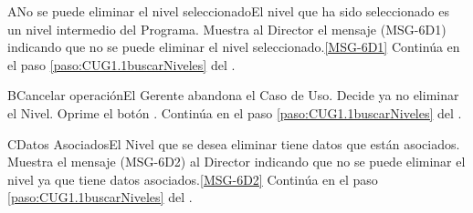 		\begin{UCtrayectoriaA}{A}{No se puede eliminar el nivel seleccionado}{El nivel que ha sido seleccionado es un nivel intermedio del Programa.}
			\UCpaso Muestra al Director el mensaje (MSG-6D1) indicando que no se puede eliminar el nivel seleccionado.\ref{MSG-6D1}
			\UCpaso Continúa en el paso \ref{paso:CUG1.1buscarNiveles} del .
		\end{UCtrayectoriaA}

		\begin{UCtrayectoriaA}{B}{Cancelar operación}{El Gerente abandona el Caso de Uso.}
			\UCpaso[\UCactor] Decide ya no eliminar el Nivel.
			\UCpaso[\UCactor] Oprime el botón .
			\UCpaso Continúa en el paso \ref{paso:CUG1.1buscarNiveles} del .
		\end{UCtrayectoriaA}
		
		\begin{UCtrayectoriaA}{C}{Datos Asociados}{El Nivel que se desea eliminar tiene datos que están asociados.}
			\UCpaso Muestra el mensaje (MSG-6D2) al Director indicando que no se puede eliminar el nivel ya que tiene datos asociados.\ref{MSG-6D2}
			\UCpaso Continúa en el paso \ref{paso:CUG1.1buscarNiveles} del .
		\end{UCtrayectoriaA}
